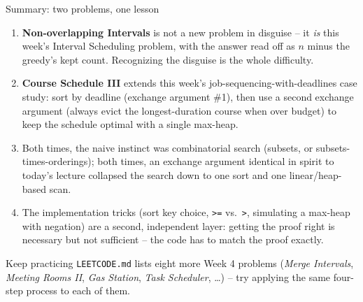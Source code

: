 \documentclass[11pt,aspectratio=169]{beamer}
\begin{document}
\begin{frame}{Summary: two problems, one lesson}
  \footnotesize
  \begin{enumerate}
    \item \textbf{Non-overlapping Intervals} is not a new problem in disguise -- it
    \emph{is} this week's Interval Scheduling problem, with the answer read off as
    $n$ minus the greedy's kept count. Recognizing the disguise is the whole
    difficulty.
    \item \textbf{Course Schedule III} extends this week's job-sequencing-with-deadlines
    case study: sort by deadline (exchange argument \#1), then use a second exchange
    argument (always evict the longest-duration course when over budget) to keep the
    schedule optimal with a single max-heap.
    \item Both times, the naive instinct was combinatorial search (subsets, or
    subsets-times-orderings); both times, an exchange argument identical in spirit to
    today's lecture collapsed the search down to one sort and one linear/heap-based
    scan.
    \item The implementation tricks (sort key choice, \texttt{>=} vs.\ \texttt{>},
    simulating a max-heap with negation) are a second, independent layer: getting the
    proof right is necessary but not sufficient -- the code has to match the proof
    exactly.
  \end{enumerate}
  \begin{alertblock}{Keep practicing}
    \texttt{LEETCODE.md} lists eight more Week 4 problems (\emph{Merge Intervals},
    \emph{Meeting Rooms II}, \emph{Gas Station}, \emph{Task Scheduler}, \dots) -- try
    applying the same four-step process to each of them.
  \end{alertblock}
\end{frame}
\end{document}

